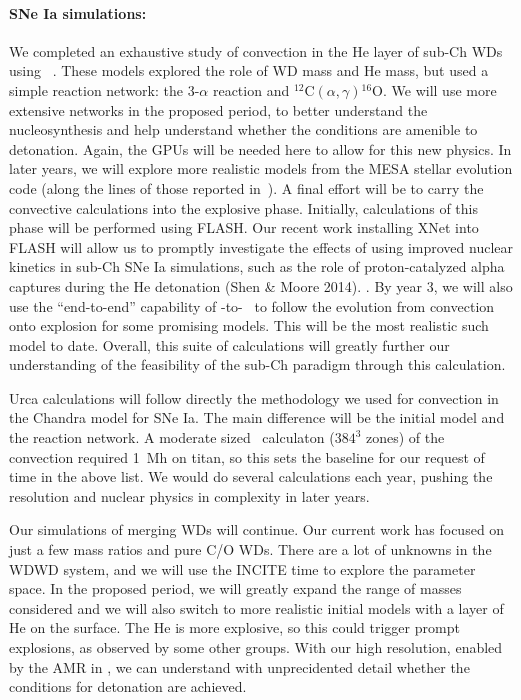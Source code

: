 \paragraph{SNe Ia simulations: }  
%
We completed an exhaustive study of convection in the He layer of
sub-Ch WDs using \maestro~\cite{jacobs:2016}.  These models explored
the role of WD mass and He mass, but used a simple reaction network:
the 3-$\alpha$ reaction and $^{12}\mathrm{C}
(\alpha,\gamma){}^{16}\mathrm{O}$.  We will use more extensive
networks in the proposed period, to better understand the
nucleosynthesis and help understand whether the conditions are
amenible to detonation.  Again, the GPUs will be needed here to allow
for this new physics.  In later years, we will explore more realistic
models from the MESA stellar evolution code (along the lines of those
reported in~\cite{brooks:2015}).  A final effort will be to carry the
convective calculations into the explosive phase. Initially, calculations
of this phase will be performed using FLASH. Our recent work installing 
XNet into FLASH will allow us to promptly investigate the effects of 
using improved nuclear kinetics in sub-Ch SNe Ia simulations, such as 
the role of proton-catalyzed alpha captures during the He detonation 
(Shen \& Moore 2014). \flash{}.  By year 3, we will also use the ``end-to-end'' capability
of \maestro-to-\castro~\cite{Mal14} to follow the evolution from
convection onto explosion for some promising models.  This will be the
most realistic such model to date.  Overall, this suite of
calculations will greatly further our understanding of the feasibility
of the sub-Ch paradigm through this calculation.

Urca calculations will follow directly the methodology we used for
convection in the Chandra model for SNe Ia.  The main difference will
be the initial model and the reaction network.  A moderate sized
\maestro\ calculaton ($384^3$ zones) of the convection required 1~Mh
on titan, so this sets the baseline for our request of time in the
above list.  We would do several calculations each year, pushing the
resolution and nuclear physics in complexity in later years.

Our simulations of merging WDs will continue.  Our current work has
focused on just a few mass ratios and pure C/O WDs.  There are a lot
of unknowns in the WDWD system, and we will use the INCITE time to
explore the parameter space.  In the proposed period, we will greatly
expand the range of masses considered and we will also switch to more
realistic initial models with a layer of He on the surface.  The He is
more explosive, so this could trigger prompt explosions, as observed
by some other groups.  With our high resolution, enabled by the AMR in
\castro, we can understand with unprecidented detail whether the
conditions for detonation are achieved.  

